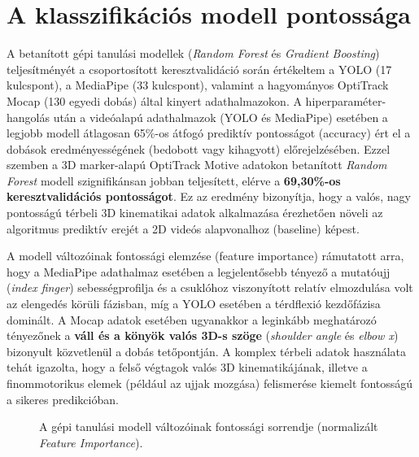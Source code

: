 \section{A klasszifikációs modell pontossága}
A betanított gépi tanulási modellek (\textit{Random Forest} és \textit{Gradient Boosting}) teljesítményét a csoportosított keresztvalidáció során értékeltem a YOLO (17 kulcspont), a MediaPipe (33 kulcspont), valamint a hagyományos OptiTrack Mocap (130 egyedi dobás) által kinyert adathalmazokon. A hiperparaméter-hangolás után a videóalapú adathalmazok (YOLO és MediaPipe) esetében a legjobb modell átlagosan 65\%-os átfogó prediktív pontosságot (accuracy) ért el a dobások eredményességének (bedobott vagy kihagyott) előrejelzésében. Ezzel szemben a 3D marker-alapú OptiTrack Motive adatokon betanított \textit{Random Forest} modell szignifikánsan jobban teljesített, elérve a \textbf{69,30\%-os keresztvalidációs pontosságot}. Ez az eredmény bizonyítja, hogy a valós, nagy pontosságú térbeli 3D kinematikai adatok alkalmazása érezhetően növeli az algoritmus prediktív erejét a 2D videós alapvonalhoz (baseline) képest.

A modell változóinak fontossági elemzése (feature importance) rámutatott arra, hogy a MediaPipe adathalmaz esetében a legjelentősebb tényező a mutatóujj (\textit{index finger}) sebességprofilja és a csuklóhoz viszonyított relatív elmozdulása volt az elengedés körüli fázisban, míg a YOLO esetében a térdflexió kezdőfázisa dominált. A Mocap adatok esetében ugyanakkor a leginkább meghatározó tényezőnek a \textbf{váll és a könyök valós 3D-s szöge} (\textit{shoulder angle} és \textit{elbow x}) bizonyult közvetlenül a dobás tetőpontján. A komplex térbeli adatok használata tehát igazolta, hogy a felső végtagok valós 3D kinematikájának, illetve a finommotorikus elemek (például az ujjak mozgása) felismerése kiemelt fontosságú a sikeres predikcióban.

\begin{figure}[!ht]
\centering
{}
\caption{A gépi tanulási modell változóinak fontossági sorrendje (normalizált \textit{Feature Importance}).}
\label{fig:feature_importance}
\end{figure}
